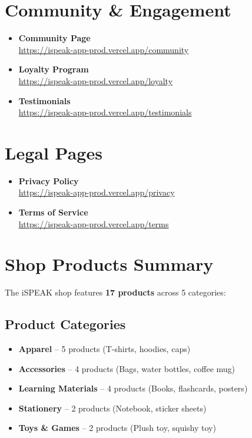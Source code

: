 \documentclass[11pt,a4paper]{article}
\begin{document}
\section{Community \& Engagement}

\begin{itemize}[itemsep=0.5em]
    \item \textbf{Community Page}\\
    \href{https://ispeak-app-prod.vercel.app/community}{https://ispeak-app-prod.vercel.app/community}
    
    \item \textbf{Loyalty Program}\\
    \href{https://ispeak-app-prod.vercel.app/loyalty}{https://ispeak-app-prod.vercel.app/loyalty}
    
    \item \textbf{Testimonials}\\
    \href{https://ispeak-app-prod.vercel.app/testimonials}{https://ispeak-app-prod.vercel.app/testimonials}
\end{itemize}

\section{Legal Pages}

\begin{itemize}[itemsep=0.5em]
    \item \textbf{Privacy Policy}\\
    \href{https://ispeak-app-prod.vercel.app/privacy}{https://ispeak-app-prod.vercel.app/privacy}
    
    \item \textbf{Terms of Service}\\
    \href{https://ispeak-app-prod.vercel.app/terms}{https://ispeak-app-prod.vercel.app/terms}
\end{itemize}

\section{Shop Products Summary}

The iSPEAK shop features \textbf{17 products} across 5 categories:

\subsection{Product Categories}
\begin{itemize}
    \item \textbf{Apparel} -- 5 products (T-shirts, hoodies, caps)
    \item \textbf{Accessories} -- 4 products (Bags, water bottles, coffee mug)
    \item \textbf{Learning Materials} -- 4 products (Books, flashcards, posters)
    \item \textbf{Stationery} -- 2 products (Notebook, sticker sheets)
    \item \textbf{Toys \& Games} -- 2 products (Plush toy, squishy toy)
\end{itemize}
\end{document}
